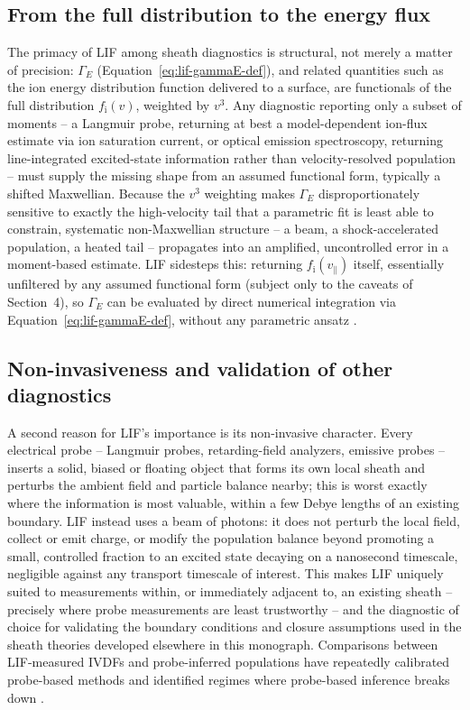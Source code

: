 \subsection{From the full distribution to the energy flux}

The primacy of LIF among sheath diagnostics is structural, not merely a matter of precision: $\Gamma_{E}$ (Equation~\eqref{eq:lif-gammaE-def}), and related quantities such as the ion energy distribution function delivered to a surface, are functionals of the full distribution $f_{\mathrm{i}}(v)$, weighted by $v^{3}$. Any diagnostic reporting only a subset of moments -- a Langmuir probe, returning at best a model-dependent ion-flux estimate via ion saturation current, or optical emission spectroscopy, returning line-integrated excited-state information rather than velocity-resolved population -- must supply the missing shape from an assumed functional form, typically a shifted Maxwellian. Because the $v^{3}$ weighting makes $\Gamma_{E}$ disproportionately sensitive to exactly the high-velocity tail that a parametric fit is least able to constrain, systematic non-Maxwellian structure -- a beam, a shock-accelerated population, a heated tail -- propagates into an amplified, uncontrolled error in a moment-based estimate. LIF sidesteps this: returning $f_{\mathrm{i}}(v_{\parallel})$ itself, essentially unfiltered by any assumed functional form (subject only to the caveats of Section~4), so $\Gamma_{E}$ can be evaluated by direct numerical integration via Equation~\eqref{eq:lif-gammaE-def}, without any parametric ansatz \cite{ref0338,ref0347}.

\subsection{Non-invasiveness and validation of other diagnostics}

A second reason for LIF's importance is its non-invasive character. Every electrical probe -- Langmuir probes, retarding-field analyzers, emissive probes -- inserts a solid, biased or floating object that forms its own local sheath and perturbs the ambient field and particle balance nearby; this is worst exactly where the information is most valuable, within a few Debye lengths of an existing boundary. LIF instead uses a beam of photons: it does not perturb the local field, collect or emit charge, or modify the population balance beyond promoting a small, controlled fraction to an excited state decaying on a nanosecond timescale, negligible against any transport timescale of interest. This makes LIF uniquely suited to measurements within, or immediately adjacent to, an existing sheath -- precisely where probe measurements are least trustworthy -- and the diagnostic of choice for validating the boundary conditions and closure assumptions used in the sheath theories developed elsewhere in this monograph. Comparisons between LIF-measured IVDFs and probe-inferred populations have repeatedly calibrated probe-based methods and identified regimes where probe-based inference breaks down \cite{ref0329}.

